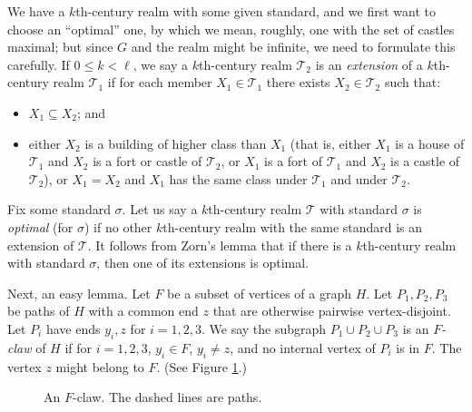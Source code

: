 \documentclass[titlepage,11pt]{article}
\newcommand{\mac}{\mathcal}
\begin{document}
	We have a $k$th-century realm with some given standard, and we first want to choose an ``optimal'' one,
	by which we mean, roughly, one with
	the set of castles maximal;
	but since $G$ and the realm might be infinite, we need to formulate this
	carefully. If $0\le k<\ell$, we say a $k$th-century realm $\mac T_2$
	is an {\em extension} of a $k$th-century realm $\mac T_1$ if for each member $X_1\in \mac T_1$ there exists $X_2\in \mac T_2$ such that:
	\begin{itemize}
		\item $X_1\subseteq X_2$; and
		\item either $X_2$ is a building of higher class than $X_1$ (that is, either $X_1$ is a house of $\mac T_1$ and $X_2$ is a fort or castle of
		$\mac T_2$, or $X_1$ is a fort of $\mac T_1$ and $X_2$ is a castle of $\mac T_2$), or $X_1=X_2$ and $X_1$ has the same class under $\mac T_1$ and under $\mac T_2$.
	\end{itemize}
	Fix some standard $\sigma$.
	Let us say a  $k$th-century realm $\mac T$ with standard $\sigma$ is {\em optimal} (for $\sigma$) if no other  $k$th-century realm with the same
	standard
	is an extension of $\mac T$.
	It follows from Zorn's lemma that if there is a $k$th-century realm with standard $\sigma$, then one of its extensions is optimal.
	
	Next, an easy lemma. Let $F$ be a subset of vertices of a graph $H$. Let $P_1,P_2,P_3$ be paths of $H$ with a common end $z$ that are 
	otherwise pairwise vertex-disjoint. Let $P_i$ have ends $y_i, z$ for $i = 1,2,3$. We say the subgraph $P_1\cup P_2\cup P_3$
	is an {\em $F$-claw} of $H$ if for $i = 1,2,3$, $y_i\in F$, $y_i\ne z$, and no internal vertex of $P_i$ is in $F$. The vertex $z$ might belong to $F$. (See Figure \ref{fig:Fclaw}.)
	
	\begin{figure}[H]
		\begin{center}
		\end{center}
		\caption{An $F$-claw. The dashed lines are paths.} \label{fig:Fclaw}
	\end{figure}
	
\end{document}
